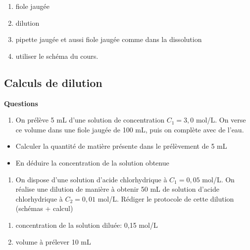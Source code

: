 \documentclass[
]{book}
\providecommand{\tightlist}{%
  \setlength{\itemsep}{0pt}\setlength{\parskip}{0pt}}
\def\tightlist{}
\begin{document}
\begin{enumerate}
\def\labelenumi{\arabic{enumi}.}
\tightlist
\item
  fiole jaugée
\item
  dilution
\item
  pipette jaugée et aussi fiole jaugée comme dans la dissolution
\item
  utiliser le schéma du cours.
\end{enumerate}

\hypertarget{calculs-de-dilution}{%
\subsection{Calculs de dilution}\label{calculs-de-dilution}}

\begin{blackbox}

\begin{center}
\textbf{Questions}

\end{center}

\begin{enumerate}
\def\labelenumi{\arabic{enumi}.}
\tightlist
\item
  On prélève 5 mL d'une solution de concentration \(C_1=3,0\) mol/L. On verse ce volume dans une fiole jaugée de 100 mL, puis on complète avec de l'eau.
\end{enumerate}

\begin{itemize}
\tightlist
\item
  Calculer la quantité de matière présente dans le prélèvement de 5 mL
\item
  En déduire la concentration de la solution obtenue
\end{itemize}

\begin{enumerate}
\def\labelenumi{\arabic{enumi}.}
\setcounter{enumi}{1}
\tightlist
\item
  On dispose d'une solution d'acide chlorhydrique à \(C_1= 0,05\) mol/L. On réalise une dilution de manière à obtenir 50 mL de solution d'acide chlorhydrique à \(C_2= 0,01\) mol/L. Rédiger le protocole de cette dilution (schémas + calcul)
\end{enumerate}

\end{blackbox}

\begin{enumerate}
\def\labelenumi{\arabic{enumi}.}
\tightlist
\item
  concentration de la solution diluée: 0,15 mol/L
\item
  volume à prélever 10 mL
\end{enumerate}
\end{document}
